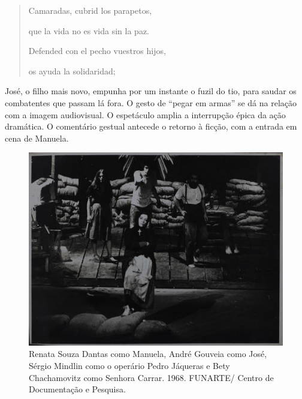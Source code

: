 \begin{quote}
Camaradas, cubrid los parapetos,

que la vida no es vida sin la paz.

Defended con el pecho vuestros hijos,

os ayuda la solidaridad;
\end{quote}

José, o filho mais novo, empunha por um instante o fuzil do tio, para
saudar os combatentes que passam lá fora. O gesto de “pegar em armas” se
dá na relação com a imagem audiovisual. O espetáculo amplia a
interrupção épica da ação dramática. O comentário gestual antecede o
retorno à ficção, com a entrada em cena de Manuela.

\begin{figure}
\includegraphics[width=\columnwidth]{./media/IMAGEM43.jpg}
\caption{Renata Souza Dantas como Manuela, André Gouveia como José, Sérgio
Mindlin como o operário Pedro Jáqueras e Bety Chachamovitz como Senhora
Carrar. 1968. FUNARTE/ Centro de Documentação e Pesquisa.}
\end{figure}

